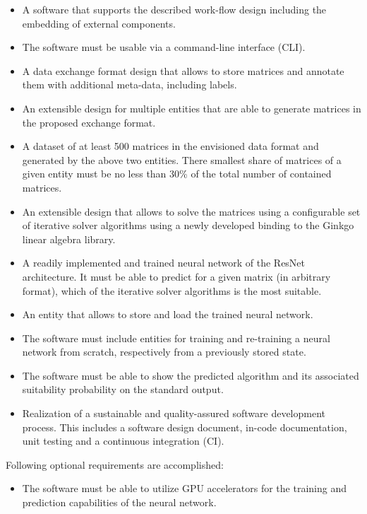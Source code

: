 \documentclass[parskip=full]{scrartcl}
\begin{document}
\begin{itemize}
\item A software that supports the described work-flow design including the embedding of external components.

\item The software must be usable via a \gls{command-line interface} (CLI).

\item A data exchange format design that allows to store matrices and annotate them with 
additional meta-data, including labels.

\item An extensible design for multiple entities that are able to generate matrices in the proposed exchange format.

\item A dataset of at least 500 matrices in the envisioned data format and generated by the above two entities. 
There smallest share of matrices of a given entity must be no less than 30\% of the total number of contained matrices.

\item An extensible design that allows to solve the matrices using a configurable set of \gls{iterative solver} algorithms using a newly developed binding to the \gls{Ginkgo} linear algebra library.

\item A readily implemented and trained \gls{neural network} of the \gls{ResNet} architecture. 
It must be able to predict for a given matrix (in arbitrary format), which of the \gls{iterative solver} algorithms is the most suitable.

\item An entity that allows to store and load the trained \gls{neural network}.

\item The software must include entities for training and re-training a \gls{neural network} from scratch, respectively from a previously stored state.

\item The software must be able to show the predicted \gls{algorithm} and its associated suitability probability on the standard output.

\item Realization of a sustainable and quality-assured software development process. 
This includes a software design document, in-code documentation, unit testing and a continuous integration (CI).
\end{itemize}
Following optional requirements are accomplished:
\begin{itemize}
\item The software must be able to utilize GPU accelerators for the training and prediction capabilities of the neural network.
\end{itemize}
\end{document}

